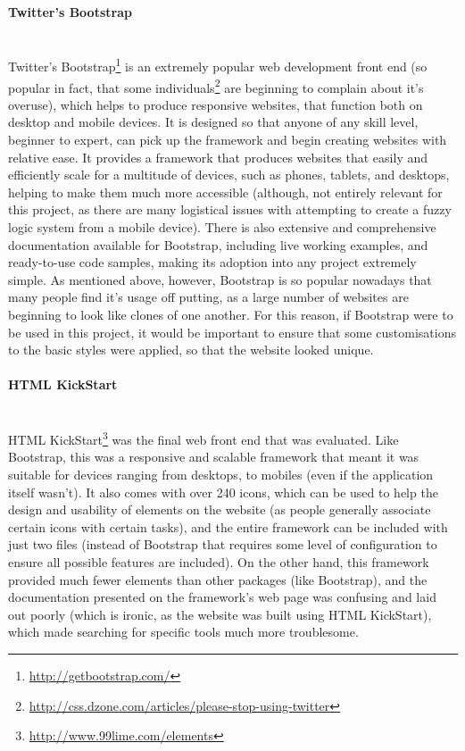 \paragraph{Twitter's Bootstrap}\ \\
Twitter's Bootstrap\footnote{\url{http://getbootstrap.com/}} is an extremely popular web development front end (so popular in fact, that some individuals\footnote{\url{http://css.dzone.com/articles/please-stop-using-twitter}} are beginning to complain about it's overuse), which helps to produce responsive websites, that function both on desktop and mobile devices. It is designed so that anyone of any skill level, beginner to expert, can pick up the framework and begin creating websites with relative ease. It provides a framework that produces websites that easily and efficiently scale for a multitude of devices, such as phones, tablets, and desktops, helping to make them much more accessible (although, not entirely relevant for this project, as there are many logistical issues with attempting to create a fuzzy logic system from a mobile device). There is also extensive and comprehensive documentation available for Bootstrap, including live working examples, and ready-to-use code samples, making its adoption into any project extremely simple. As mentioned above, however, Bootstrap is so popular nowadays that many people find it's usage off putting, as a large number of websites are beginning to look like clones of one another. For this reason, if Bootstrap were to be used in this project, it would be important to ensure that some customisations to the basic styles were applied, so that the website looked unique.

\paragraph{HTML KickStart}\ \\
HTML KickStart\footnote{\url{http://www.99lime.com/elements}} was the final web front end that was evaluated. Like Bootstrap, this was a responsive and scalable framework that meant it was suitable for devices ranging from desktops, to mobiles (even if the application itself wasn't). It also comes with over 240 icons, which can be used to help the design and usability of elements on the website (as people generally associate certain icons with certain tasks), and the entire framework can be included with just two files (instead of Bootstrap that requires some level of configuration to ensure all possible features are included). On the other hand, this framework provided much fewer elements than other packages (like Bootstrap), and the documentation presented on the framework's web page was confusing and laid out poorly (which is ironic, as the website was built using HTML KickStart), which made searching for specific tools much more troublesome. 

